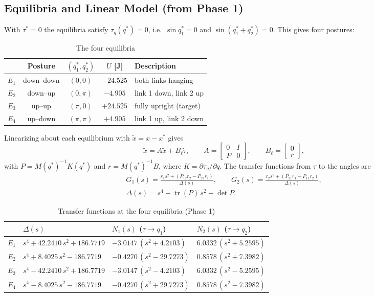 \documentclass[12pt,a4paper]{article}
\begin{document}
\subsection{Equilibria and Linear Model (from Phase 1)}
With $\tau^*=0$ the equilibria satisfy $\tau_g(q^*)=0$, i.e.\ $\sin q_1^*=0$ and $\sin(q_1^*+q_2^*)=0$. This gives four postures:
\begin{table}[H]
\centering
\caption{The four equilibria}
\begin{tabular}{|c|c|c|c|l|}
\hline
 & Posture & $(q_1^*,q_2^*)$ & $U$ [J] & Description\\ \hline
$E_1$ & down--down & $(0,0)$ & $-24.525$ & both links hanging\\
$E_2$ & down--up & $(0,\pi)$ & $-4.905$ & link 1 down, link 2 up\\
$E_3$ & up--up & $(\pi,0)$ & $+24.525$ & fully upright (target)\\
$E_4$ & up--down & $(\pi,\pi)$ & $+4.905$ & link 1 up, link 2 down\\ \hline
\end{tabular}
\end{table}
Linearizing about each equilibrium with $\tilde x=x-x^*$ gives
\begin{equation}
\dot{\tilde x}=A\tilde x+B_\ell\tilde\tau,\qquad A=\begin{bmatrix}0&I\\P&0\end{bmatrix},\qquad B_\ell=\begin{bmatrix}0\\r\end{bmatrix},\label{eq:lin}
\end{equation}
with $P=M(q^*)^{-1}K(q^*)$ and $r=M(q^*)^{-1}B$,
where $K=\partial\tau_g/\partial q$. The transfer functions from $\tau$ to the angles are
\begin{gather}
G_1(s)=\frac{r_1s^2+(P_{12}r_2-P_{22}r_1)}{\Delta(s)},\qquad
G_2(s)=\frac{r_2s^2+(P_{21}r_1-P_{11}r_2)}{\Delta(s)},\label{eq:tf}\\
\Delta(s)=s^4-\operatorname{tr}(P)\,s^2+\det P .\nonumber
\end{gather}
\begin{table}[H]
\centering
\caption{Transfer functions at the four equilibria (Phase 1)}
\label{tab:tf}
\small
\begin{tabular}{|c|l|l|l|}
\hline
 & $\Delta(s)$ & $N_1(s)$ ($\tau\to q_1$) & $N_2(s)$ ($\tau\to q_2$)\\ \hline
$E_1$ & $s^4+42.2410\,s^2+186.7719$ & $-3.0147\,(s^2+4.2103)$ & $6.0332\,(s^2+5.2595)$\\
$E_2$ & $s^4+8.4025\,s^2-186.7719$ & $-0.4270\,(s^2-29.7273)$ & $0.8578\,(s^2+7.3982)$\\
$E_3$ & $s^4-42.2410\,s^2+186.7719$ & $-3.0147\,(s^2-4.2103)$ & $6.0332\,(s^2-5.2595)$\\
$E_4$ & $s^4-8.4025\,s^2-186.7719$ & $-0.4270\,(s^2+29.7273)$ & $0.8578\,(s^2-7.3982)$\\ \hline
\end{tabular}
\end{table}
\end{document}
